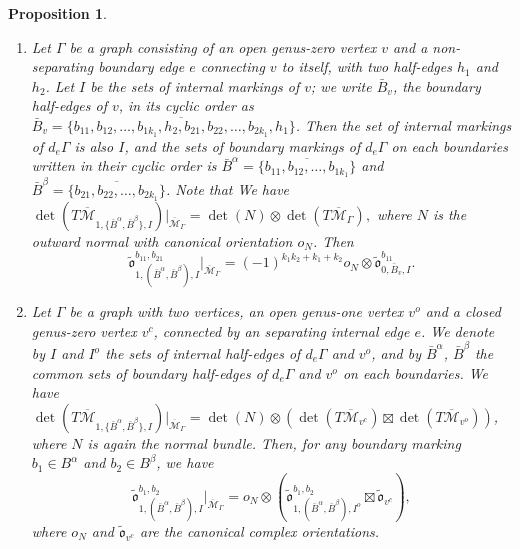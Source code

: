 \documentclass[11pt,a4paper]{article}
\newtheorem{prop}[dummy]{Proposition}
\theoremstyle{definition}
\theoremstyle{remark}
\numberwithin{equation}{section}
\def\Mbar{{\overline{\mathcal M}}}
\begin{document}
\begin{prop}
\begin{enumerate}
         \item \label{item orientation moduli nonseperating}
          Let $\Gamma$ be a graph consisting of an open genus-zero vertex $v$ and a non-separating boundary edge $e$ connecting $v$ to itself, with two half-edges $h_1$ and $h_2$.  Let $I$ be the sets of internal markings of $v$; we write $\bar{B}_v$, the boundary half-edges of $v$, in its cyclic order as $\bar{B}_v=\overline{\{b_{11},b_{12},\dots,b_{1k_1},h_2,b_{21},b_{22},\dots,b_{2k_1},h_1\}}$. Then the set of internal markings of $d_e \Gamma$ is also $I$, and the sets of boundary markings of $d_e \Gamma$ on each boundaries written in their cyclic order is $\bar{B}^\alpha=\overline{\{b_{11},b_{12},\dots,b_{1k_1}\}}$ and $\bar{B}^\beta=\overline{\{b_{21},b_{22},\dots,b_{2k_1}\}}$. 
          Note that We have $\det(T\Mbar_{1,\{\bar{B}^\alpha,\bar B^\beta\},I})\big|_{\Mbar_\Gamma} = \det(N)\otimes \det( T\Mbar_{\Gamma}),$ where $N$ is the outward normal with canonical orientation $o_N$. Then 
        \begin{equation}\label{eq orientation genus one moduli non-separating}
        \tilde{\mathfrak{o}}^{b_{11},b_{21}}_{1,(\bar{B}^\alpha,\bar{B}^\beta),I}\big |_{\Mbar_\Gamma^{}}=
         (-1)^{k_1 k_2+k_1+k_2}o_N\otimes \tilde{\mathfrak{o}}^{b_{11}}_{0,\bar B_v,I}.
         \end{equation}

        \item \label{item orientation moduli closed open g=1}

        Let $\Gamma$ be a graph with two vertices, an open genus-one vertex $v^o$ and a closed genus-zero vertex $v^c$, connected by an separating internal edge $e$.  We denote by $I$ and $I^o$ the sets of internal half-edges of $d_e\Gamma$ and $v^o$, and by $\bar B^\alpha$, $\bar B^\beta$ the common sets of boundary half-edges of $d_e\Gamma$ and $v^o$ on each boundaries. We have $\det(T\Mbar_{1,\{\bar{B}^\alpha,\bar B^\beta\},I})\big|_{\Mbar_\Gamma} = \det(N)\otimes \left(\det(T\Mbar_{v^c})\boxtimes \det(T\Mbar_{v^o})\right)$, where $N$ is again the normal bundle.  Then, for any boundary marking $b_1\in B^\alpha$ and $b_2\in B^\beta$, we have
        \begin{equation}\label{eq orientation moduli closed open g=1}
        \tilde{\mathfrak{o}}^{b_1,b_2}_{1,(\bar{B}^\alpha,\bar B^\beta),I}|_{\Mbar_\Gamma} = o_N\otimes (\tilde{\mathfrak{o}}^{b_1,b_2}_{1,(\bar{B}^\alpha,\bar B^\beta),I^o}\boxtimes \tilde{\mathfrak{o}}_{v^c}),
        \end{equation}
        where $o_N$ and $\tilde{\mathfrak{o}}_{v^c}$ are the canonical complex orientations.

    \end{enumerate}
\end{prop}
\end{document}
